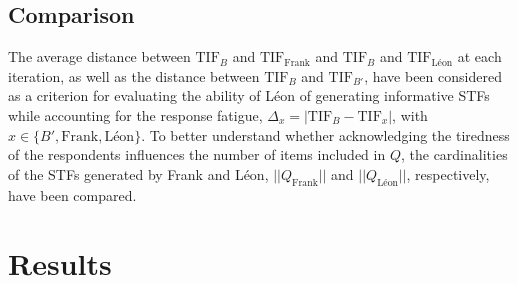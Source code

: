 \documentclass{svproc}
\begin{document}
\subsection{Comparison}

The average distance between $\text{TIF}_B$ and $\text{TIF}_{\text{Frank}}$ and $\text{TIF}_B$ and $\text{TIF}_{\text{Léon}}$ at each iteration, as well as the  distance between $\text{TIF}_B$ and $\text{TIF}_{B'}$, have been considered as a criterion for evaluating the ability of Léon of generating informative STFs while accounting for the response fatigue, $\Delta_x = |\text{TIF}_B - \text{TIF}_{x}|$, with $x \in \{B', \text{Frank}, \text{Léon}\}$.  
To better understand whether acknowledging the tiredness of the respondents influences the number of items included in $Q$, the cardinalities of the STFs generated by Frank and Léon, $||Q_{\text{Frank}}||$ and $||Q_{\text{Léon}}||$, respectively, have been compared. 

  

\section{Results}

%
\end{document}
